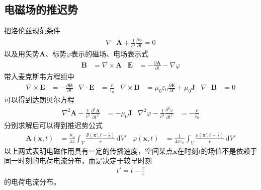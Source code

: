 \documentclass{article} %
\begin{document}
\subsection{电磁场的推迟势}
把洛伦兹规范条件
\begin{align*}
  \nabla \cdot \pmb{A}+\frac{1}{c^2}\frac{\partial \varphi}{\partial t}=0
\end{align*}
以及用矢势$\pmb{A}$、标势$\varphi$表示的磁场、电场表示式
\begin{align*}
  \pmb{B} & =\nabla \times \pmb{A} & \pmb{E} & =-\frac{\partial \pmb{A}}{\partial t}-\nabla \varphi
\end{align*}
带入麦克斯韦方程组中
\begin{align*}
  \nabla \times \pmb{E} & =-\frac{\partial \pmb{B}}{\partial t} & \nabla \cdot \pmb{E} & =\frac{\rho}{\varepsilon_0} & \nabla \times \pmb{B} & =\mu_0 \varepsilon_0\frac{\partial \pmb{E}}{\partial t}+\mu_0 \pmb{J} & \nabla \cdot \pmb{B} & =0
\end{align*}
可以得到达朗贝尔方程
\begin{align*}
  \nabla^2 \pmb{A}-\frac{1}{c^2}\frac{\partial^2 \pmb{A}}{\partial t^2} & =-\mu_0\pmb{J} & \nabla^2 \varphi-\frac{1}{c^2}\frac{\partial^2 \varphi}{\partial t^2} & =-\frac{\rho}{\varepsilon_0}
\end{align*}
分别求解后可以得到推迟势公式
\begin{align}
  \pmb{A}(\pmb{x},t) & =\frac{\mu_0}{4\pi}\int_V \frac{\pmb{J}\left(\pmb{x}',t-\frac{r}{c} \right)}{r} \,\mathrm{d}V' & \varphi(\pmb{x},t) & =\frac{1}{4\pi\varepsilon_0}\int_V \frac{\rho\left(\pmb{x}',t-\frac{r}{c} \right)}{r} \,\mathrm{d}V' \label{e1}
\end{align}
以上两式表明电磁作用具有一定的传播速度，空间某点$\pmb{x}$在时刻$t$的场值不是依赖于同一时刻的电荷电流分布，而是决定于较早时刻
\begin{align*}
  t'=t-\frac{r}{c}
\end{align*}
的电荷电流分布。
\end{document}
